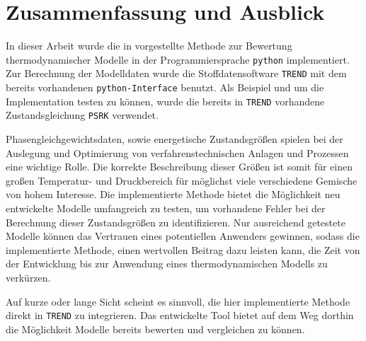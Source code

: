 \documentclass[../thesis.tex]{subfiles}
\begin{document}
\chapter{Zusammenfassung und Ausblick}

In dieser Arbeit wurde die in \cite{jaubert2020benchmark} vorgestellte Methode zur Bewertung thermodynamischer Modelle in der Programmiersprache \texttt{python} implementiert. Zur Berechnung der Modelldaten wurde die Stoffdatensoftware \texttt{TREND} mit dem bereits vorhandenen \texttt{python-Interface} benutzt. Als Beispiel und um die Implementation testen zu können, wurde die bereits in \texttt{TREND} vorhandene Zustandsgleichung \texttt{PSRK} verwendet.

Phasengleichgewichtsdaten, sowie energetische Zustandsgrößen spielen bei der Auslegung und Optimierung von verfahrenstechnischen Anlagen und Prozessen eine wichtige Rolle. Die korrekte Beschreibung dieser Größen ist somit für einen großen Temperatur- und Druckbereich für möglichst viele verschiedene Gemische von hohem Interesse. Die implementierte Methode bietet die Möglichkeit neu entwickelte Modelle umfangreich zu testen, um vorhandene Fehler bei der Berechnung dieser Zustandsgrößen zu identifizieren. Nur ausreichend getestete Modelle können das Vertrauen eines potentiellen Anwenders gewinnen, sodass die implementierte Methode, einen wertvollen Beitrag dazu leisten kann, die Zeit von der Entwicklung bis zur Anwendung eines thermodynamischen Modells zu verkürzen.

Auf kurze oder lange Sicht scheint es sinnvoll, die hier implementierte Methode direkt in \texttt{TREND} zu integrieren. Das entwickelte Tool bietet auf dem Weg dorthin die Möglichkeit Modelle bereits bewerten und vergleichen zu können.
\end{document}
